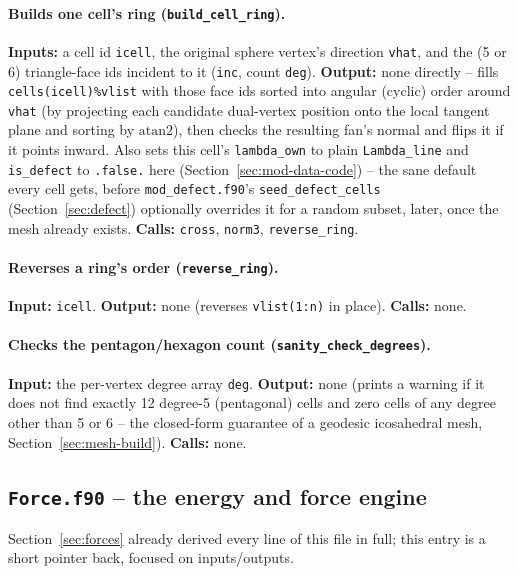 \documentclass[11pt,a4paper]{report}
\begin{document}
\paragraph{Builds one cell's ring (\texttt{build\_cell\_ring}).}
\textbf{Inputs:} a cell id \texttt{icell}, the original sphere vertex's
direction \texttt{vhat}, and the (5 or 6) triangle-face ids incident to
it (\texttt{inc}, count \texttt{deg}). \textbf{Output:} none directly
-- fills \texttt{cells(icell)\%vlist} with those face ids sorted into
angular (cyclic) order around \texttt{vhat} (by projecting each
candidate dual-vertex position onto the local tangent plane and
sorting by $\mathrm{atan2}$), then checks the resulting fan's normal
and flips it if it points inward. Also sets this cell's
\texttt{lambda\_own} to plain \texttt{Lambda\_line} and
\texttt{is\_defect} to \texttt{.false.} here (Section~\ref{sec:mod-data-code}) --
the sane default every cell gets, before \texttt{mod\_defect.f90}'s
\texttt{seed\_defect\_cells} (Section~\ref{sec:defect}) optionally
overrides it for a random subset, later, once the mesh already exists.
\textbf{Calls:} \texttt{cross}, \texttt{norm3}, \texttt{reverse\_ring}.
\paragraph{Reverses a ring's order (\texttt{reverse\_ring}).}
\textbf{Input:} \texttt{icell}. \textbf{Output:} none (reverses
\texttt{vlist(1:n)} in place). \textbf{Calls:} none.
\paragraph{Checks the pentagon/hexagon count
(\texttt{sanity\_check\_degrees}).} \textbf{Input:} the per-vertex
degree array \texttt{deg}. \textbf{Output:} none (prints a warning if
it does not find exactly 12 degree-5 (pentagonal) cells and zero cells
of any degree other than 5 or 6 -- the closed-form guarantee of a
geodesic icosahedral mesh, Section~\ref{sec:mesh-build}). \textbf{Calls:}
none.

\subsection{\texttt{Force.f90} -- the energy and force engine}
\label{sec:force-code}
Section~\ref{sec:forces} already derived every line of this file in
full; this entry is a short pointer back, focused on inputs/outputs.
\end{document}
